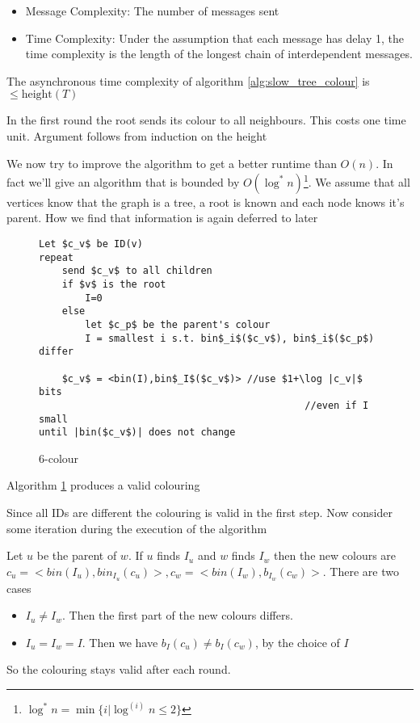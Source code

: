 \begin{itemize}
\item Message Complexity: The number of messages sent
\item Time Complexity: Under the assumption that each message has delay 1, the time complexity is the length of the longest chain of interdependent messages.
\end{itemize}

\begin{thm} The asynchronous time complexity of algorithm \ref{alg:slow_tree_colour} is $\leq \text{height}(T)$ \end{thm}
\begin{pr} In the first round the root sends its colour to all neighbours. This costs one time unit. Argument follows from induction on the height\end{pr}

We now try to improve the algorithm to get a better runtime than $O(n)$. In fact we'll give an algorithm that is bounded by $O(\log^*n)$\footnote{$\log^* n = \min \{i|\log^{(i)} n \leq 2\}$}. We assume that all vertices know that the graph is a tree, a root is known and each node knows it's parent. How we find that information is again deferred to later

\begin{figure}[hbt]
\begin{lstlisting}
Let $c_v$ be ID(v)
repeat 
	send $c_v$ to all children
	if $v$ is the root
		I=0
	else 
		let $c_p$ be the parent's colour
		I = smallest i s.t. bin$_i$($c_v$), bin$_i$($c_p$) differ
		
	$c_v$ = <bin(I),bin$_I$($c_v$)> //use $1+\log |c_v|$ bits  
											  //even if I small
until |bin($c_v$)| does not change
\end{lstlisting}
\caption{6-colour}
\label{alg:6-colour}
\end{figure}

\begin{lem} Algorithm \ref{alg:6-colour} produces a valid colouring \end{lem}

\begin{pr} Since all IDs are different the colouring is valid in the first step. Now consider some iteration during the execution of the algorithm

Let $u$ be the parent of $w$. If $u$ finds $I_u$ and $w$ finds $I_w$ then the new colours are $c_u=<bin(I_u), bin_{I_u}(c_u)>, c_w=<bin(I_w),b_{I_w}(c_w)>$. There are two cases

\begin{itemize}
\item $I_u\neq I_w$. Then the first part of the new colours differs. \ok
\item $I_u=I_w=I$. Then we have $b_I(c_u)\neq b_I(c_w)$, by the choice of $I$ \ok
\end{itemize}

So the colouring stays valid after each round.
\end{pr}


